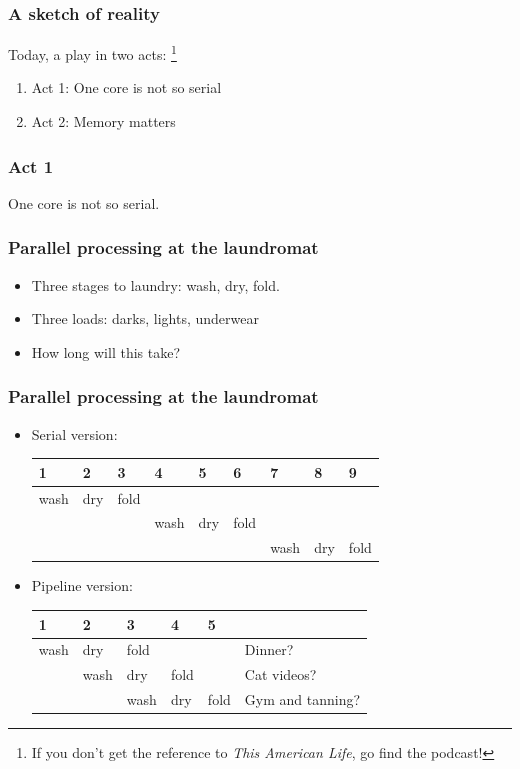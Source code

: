 \documentclass{beamer}
\begin{document}
\begin{frame}
  \frametitle{A sketch of reality}

  Today, a play in two acts:%
\footnote{%
If you don't get the reference to {\em This American Life},
go find the podcast!}
  \begin{enumerate}
  \item Act 1: One core is not so serial
  \item Act 2: Memory matters
  \end{enumerate}
\end{frame}

\begin{frame}
  \frametitle{Act 1}
  One core is not so serial.
\end{frame}

\begin{frame}
  \frametitle{Parallel processing at the laundromat}

  \begin{itemize}
  \item Three stages to laundry: wash, dry, fold.
  \item Three loads: {\color{blue} darks}, {\color{red} lights}, {\color{green} underwear}
  \item How long will this take?
  \end{itemize}
\end{frame}

\begin{frame}
  \frametitle{Parallel processing at the laundromat}

  \begin{itemize}
  \item Serial version: \\[2mm]
        \begin{tabular}{lllllllll}
          1 & 2 & 3 & 4 & 5 & 6 & 7 & 8 & 9 \\ \hline
          {\color{blue} wash} & {\color{blue} dry} & {\color{blue} fold} & & & & & & \\
          & & & {\color{red} wash} & {\color{red} dry} & {\color{red} fold} & & & \\
          & & & & & & {\color{green} wash} & {\color{green} dry} & {\color{green} fold} \\ \hline
        \end{tabular}
  \item Pipeline version: \\[2mm]
        \begin{tabular}{lllll|l}
          1 & 2 & 3 & 4 & 5 \\ \hline
          {\color{blue} wash} & {\color{blue} dry} & {\color{blue} fold} & & & Dinner? \\
          & {\color{red} wash} & {\color{red} dry} & {\color{red} fold} & & Cat videos? \\
          & & {\color{green} wash} & {\color{green} dry} & {\color{green} fold} & Gym and tanning? \\ \hline
        \end{tabular}

  \end{itemize}
\end{frame}
\end{document}
